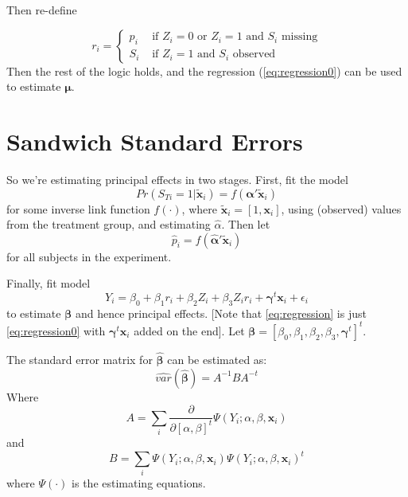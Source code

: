 \documentclass[11pt]{article} %
\begin{document}
Then re-define

\begin{equation}
  r_i=
  \begin{cases}
    p_i&\text{ if }Z_i=0\text{ or }Z_i=1\text{ and }S_i\text{ missing}\\
    S_i&\text{ if }Z_i=1\text{ and }S_i\text{ observed}
  \end{cases}
\end{equation}
Then the rest of the logic holds, and the regression (\ref{eq:regression0}) can be used to estimate $\bm{\mu}$.

\section{Sandwich Standard Errors}


So we're estimating principal effects in two stages.
First, fit the model
\begin{equation}\label{eq:psMod}
  Pr(S_{Ti}=1|\bm{\tilde{x}}_i)=f(\bm{\alpha}'\bm{\tilde{x}}_i)
\end{equation}
for some inverse link function $f(\cdot)$, where $\bm{\tilde{x}}_i=[1,\bm{x}_i]$, using (observed) values from the treatment group, and estimating $\hat{\alpha}$.
Then let
\begin{equation}\label{eq:ps}
  \hat{p}_i=f(\bm{\hat{\alpha}}'\bm{\tilde{x}}_i)
\end{equation}
for all subjects in the experiment. 

Finally, fit model
\begin{equation}\label{eq:regression}
  Y_i=\beta_0+\beta_1r_i+\beta_2Z_i+\beta_3Z_ir_i+\bm{\gamma}^t\bm{x}_i+\epsilon_i
\end{equation}
to estimate $\bm{\beta}$ and hence principal effects.
[Note that \eqref{eq:regression} is just \eqref{eq:regression0} with $\bm{\gamma}^t\bm{x}_i$ added on the end].
Let $\bm{\beta}=[\beta_0,\beta_1,\beta_2,\beta_3,\bm{\gamma}^t]^t$.

The standard error matrix for $\bm{\hat{\beta}}$ can be estimated as:
\begin{equation}\label{eq:sandwich}
  \widehat{var}(\bm{\hat{\beta}})=A^{-1}BA^{-t}
\end{equation}
Where
\begin{equation}\label{eq:Amat}
  A=\sum_i\frac{\partial}{\partial [\alpha,\beta]^t} \Psi(Y_i;\alpha,\beta,\bm{x}_i)
\end{equation}
and
\begin{equation}\label{eq:Bmat}
  B=\sum_i \Psi(Y_i;\alpha,\beta,\bm{x}_i)\Psi(Y_i;\alpha,\beta,\bm{x}_i)^t
\end{equation}
where $\Psi(\cdot)$ is the estimating equations.
\end{document}
